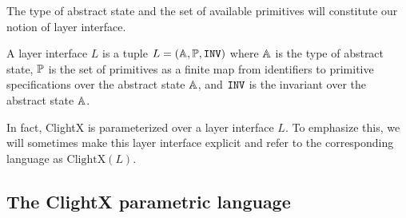 The type of abstract state and the set of available primitives
will constitute our notion of layer interface.

\begin{definition} \label{def:c-layer}
A layer interface $L$ is a tuple $ L = (\mathbb{A}, \mathbb{P}, {\texttt{INV}}) $
where $\mathbb{A}$ is the type of abstract state, $\mathbb{P}$ is the set of
primitives as a finite map from identifiers to primitive specifications
over the abstract state $\mathbb{A}$,
and ${\texttt{INV}}$ is the invariant over the abstract state $\mathbb{A}$.
\end{definition}


In fact,
ClightX is parameterized over a layer interface $L$.
To emphasize this,
we will sometimes make this layer interface explicit
and refer to the corresponding language as $\text{ClightX}(L)$.


\subsection{The ClightX parametric language}

